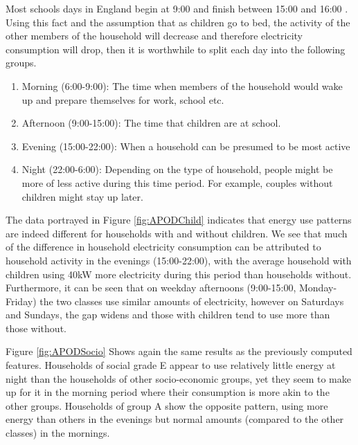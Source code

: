 Most schools days in England begin at 9:00 and finish between 15:00 and 16:00 \cite{school_times}. Using this fact and the assumption that as children go to bed, the activity of the other members of the household will decrease and therefore electricity consumption will drop, then it is worthwhile to split each day into the following groups.
\begin{enumerate}
\item Morning (6:00-9:00): The time when members of the household would wake up and prepare themselves for work, school etc.
\item Afternoon (9:00-15:00): The time that children are at school.
\item Evening (15:00-22:00):  When a household can be presumed to be most active
\item Night (22:00-6:00): Depending on the type of household, people might be more of less active during this time period. For example, couples without children might stay up later.
\end{enumerate}
\APODChild


The data portrayed in Figure \ref{fig:APODChild} indicates that energy use patterns are indeed different for households with and without children. We see that much of the difference in household electricity consumption can be attributed to household activity in the evenings (15:00-22:00), with the average household with children using 40kW more electricity during this period than households without. Furthermore, it can be seen that on weekday afternoons (9:00-15:00, Monday-Friday) the two classes use similar amounts of electricity, however on Saturdays and Sundays, the gap widens and those with children tend to use more than those without. 

\APODSocio

Figure \ref{fig:APODSocio} Shows again the same results as the previously computed features. Households of social grade E appear to use relatively little energy at night than the households of other socio-economic groups, yet they seem to make up for it in the morning period where their consumption is more akin to the other groups. Households of group A show the opposite pattern, using more energy than others in the evenings but normal amounts (compared to the other classes) in the mornings.


